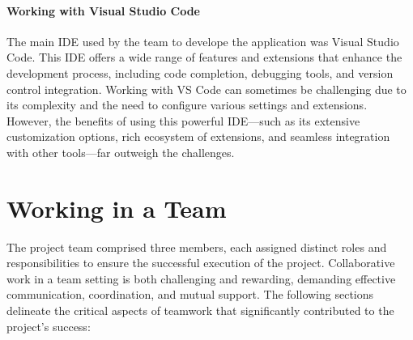 \paragraph{Working with Visual Studio Code}

The main IDE used by the team to develope the application was Visual Studio Code. This IDE offers a wide range of features and extensions that enhance the development process, including code completion, debugging tools, and version control integration.
Working with VS Code can sometimes be challenging due to its complexity and the need to configure various settings and extensions. However, the benefits of using this powerful IDE—such as its extensive customization options, rich ecosystem of extensions, and seamless integration with other tools—far outweigh the challenges.







\section{Working in a Team}

The project team comprised three members, each assigned distinct roles and responsibilities to ensure the successful execution of the project. Collaborative work in a team setting is both challenging and rewarding, demanding effective communication, coordination, and mutual support. The following sections delineate the critical aspects of teamwork that significantly contributed to the project’s success:

